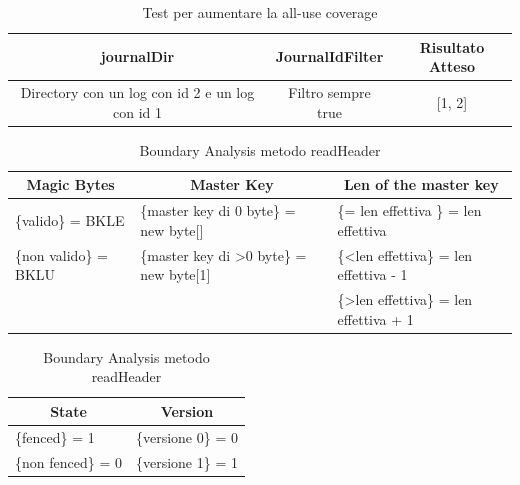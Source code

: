 \documentclass[10pt, a4paper]{article}
\begin{document}
  \begin{table}[ht]
    \centering
    \caption[Journal: Test Suite - Adequacy Data Flow 1]{Test per aumentare la all-use coverage}
    \begin{tabular}{|c|c|c|}
      \hline
      journalDir & JournalIdFilter & Risultato Atteso \\
      \hline
      {Directory con un log con id 2 e un log con id 1} & {Filtro sempre true} & [1, 2] \\
      \hline
    \end{tabular}
    \label{tab:ADF2ListJournalIds}
  \end{table}


\begin{table}[ht]
  \centering
  \caption[FileInfo: Boundary Analysis 1]{Boundary Analysis metodo readHeader}
  \begin{tabular}{|l|l|l|}
  \hline
  \multicolumn{1}{|c|}{Magic Bytes} & \multicolumn{1}{|c|}{Master Key} & \multicolumn{1}{|c|}{Len of the master key}\\
  \hline
  \{valido\} = BKLE & \{master key di 0 byte\} = new byte[] & \{= len effettiva \} = len effettiva \\
  \{non valido\} = BKLU  & \{master key di \textgreater 0 byte\} = new byte[1] & \{\textless len effettiva\} = len effettiva - 1 \\
   & & \{\textgreater len effettiva\} = len effettiva + 1 \\
  \hline
  \end{tabular}
  \label{tab:boundaryAnalyisReadHeader1}
\end{table}

\begin{table}[ht]
  \centering
  \caption[FileInfo: Boundary Analysis 2]{Boundary Analysis metodo readHeader}
  \begin{tabular}{|l|l|}
  \hline
  \multicolumn{1}{|c|}{State} & \multicolumn{1}{|c|}{Version} \\
  \hline
  \{fenced\} = 1 & \{versione 0\} = 0 \\
  \{non fenced\} = 0 & \{versione 1\} = 1\\
  \hline
  \end{tabular}
  \label{tab:boundaryAnalyisReadHeader2}
\end{table}
\end{document}
